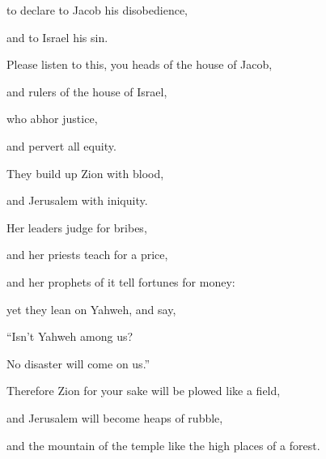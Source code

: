{\par }{\QB to declare to Jacob his disobedience,
\par }{\QB and to Israel his sin.
\par }{\Q {}Please listen to this, you heads of the house of Jacob,
\par }{\QB and rulers of the house of Israel,
\par }{\QB who abhor justice,
\par }{\QB and pervert all equity.
\par }{\Q {}They build up Zion with blood,
\par }{\QB and Jerusalem with iniquity.
\par }{\Q {}Her leaders judge for bribes,
\par }{\QB and her priests teach for a price,
\par }{\QB and her prophets of it tell fortunes for money:
\par }{\Q yet they lean on Yahweh, and say,
\par }{\QB “Isn’t Yahweh among us?
\par }{\QB No disaster will come on us.”
\par }{\Q {}Therefore Zion for your sake will be plowed like a field,
\par }{\QB and Jerusalem will become heaps of rubble,
\par }{\QB and the mountain of the temple like the high places of a forest.
\par }{\BB \par }
